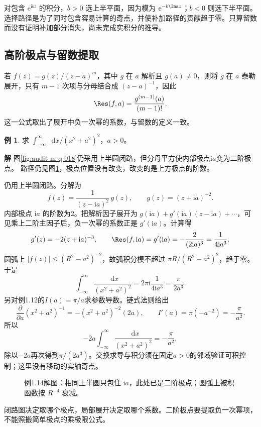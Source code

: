 \documentclass[11pt,openany,fontset=fandol]{ctexbook}
\theoremstyle{plain}\newtheorem{theorem}{定理}[chapter]\newtheorem{proposition}[theorem]{命题}
\theoremstyle{definition}\newtheorem{definition}{定义}[chapter]\newtheorem{example}{例}[chapter]
\theoremstyle{remark}\newtheorem*{remark}{说明}
\newcommand{\SolutionStart}{\par\nobreak\medskip\nobreak\noindent\textbf{解}\quad\ignorespaces}
\newenvironment{solution}{\SolutionStart}{\par\medskip}
\newcommand{\dd}{\mathop{}\!\mathrm d}\newcommand{\ii}{\mathrm i}\newcommand{\ee}{\mathrm e}
\begin{document}
对包含 $\ee^{\ii bz}$ 的积分，$b>0$ 选上半平面，因为模为 $\ee^{-b\Ima z}$；$b<0$ 则选下半平面。选择路径是为了同时包含容易计算的奇点，并使补加路径的贡献趋于零。只算留数而没有证明补加部分消失，尚未完成实积分的推导。

\subsection{高阶极点与留数提取}
若 $f(z)=g(z)/(z-a)^m$，其中 $g$ 在 $a$ 解析且 $g(a)\ne0$，则将 $g$ 在 $a$ 泰勒展开，只有 $m-1$ 次项与分母结合成 $(z-a)^{-1}$，因此
\[
\Res(f,a)=\frac{g^{(m-1)}(a)}{(m-1)!}.
\]
这一公式取出了展开中负一次幂的系数，与留数的定义一致。

\begin{example}
求 $\int_{-\infty}^{\infty}\dd x/(x^2+a^2)^2$，$a>0$。
\end{example}

\begin{solution}
图\ref{fig:audit-m-q-018}仍采用上半圆闭路，但分母平方使内部极点$\ii a$变为二阶极点。
路径仍见图\ref{fig:eg-1-14}，极点位置没有改变，改变的是上方极点的阶数。

仍用上半圆闭路。分解为
\[
f(z)=\frac1{(z-\ii a)^2}\,g(z),\qquad g(z)=(z+\ii a)^{-2}.
\]
内部极点 $\ii a$ 的阶数为2。把解析因子展开为 $g(\ii a)+g'(\ii a)(z-\ii a)+\cdots$，可见乘上二阶主因子后，负一次幂的系数正是 $g'(\ii a)$。计算得
\[
g'(z)=-2(z+\ii a)^{-3},\qquad
\Res(f,\ii a)=g'(\ii a)
=-\frac2{(2\ii a)^3}=\frac1{4\ii a^3}.
\]
圆弧上 $|f(z)|\le(R^2-a^2)^{-2}$，故弧积分模不超过 $\pi R/(R^2-a^2)^2$，趋于零。于是
\[
\int_{-\infty}^{\infty}\frac{\dd x}{(x^2+a^2)^2}
=2\pi\ii\frac1{4\ii a^3}=\frac\pi{2a^3}.
\]
另对例1.12的$I(a)=\pi/a$求参数导数。链式法则给出
\[\frac{\partial}{\partial a}(x^2+a^2)^{-1}
=-(x^2+a^2)^{-2}(2a),\qquad
I'(a)=\pi(-a^{-2})=-\frac\pi{a^2}.\]
所以
\[-2a\int_{-\infty}^{\infty}\frac{\dd x}{(x^2+a^2)^2}
=-\frac\pi{a^2},\]
除以$-2a$再次得到$\pi/(2a^3)$。交换求导与积分须在固定$a>0$的邻域验证可积控制；这里没有移动的实轴奇点。

\begin{figure}[H]\centering
{}
\caption{例1.14解图：相同上半圆只包住 $\ii a$，此处已是二阶极点；圆弧上被积函数按 $R^{-4}$ 衰减。}
\label{fig:eg-1-14}
\end{figure}

闭路图决定取哪个极点，局部展开决定取哪个系数。二阶极点要提取负一次幂项，不能照搬简单极点的乘极限公式。
\end{solution}
\end{document}
